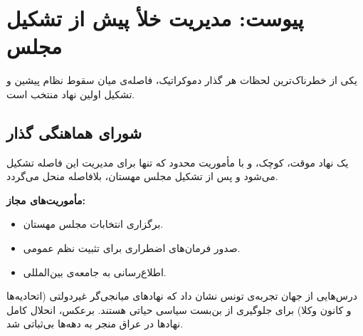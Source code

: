 \chapter*{پیوست: مدیریت خلأ پیش از تشکیل مجلس}

یکی از خطرناک‌ترین لحظات هر گذار دموکراتیک، فاصله‌ی میان سقوط نظام پیشین و تشکیل اولین نهاد منتخب است.

\section{شورای هماهنگی گذار}
یک نهاد موقت، کوچک، و با مأموریت محدود که تنها برای مدیریت این فاصله تشکیل می‌شود و پس از تشکیل مجلس مهستان، بلافاصله منحل می‌گردد.

\textbf{مأموریت‌های مجاز:}
\begin{itemize}
    \item برگزاری انتخابات مجلس مهستان.
    \item صدور فرمان‌های اضطراری برای تثبیت نظم عمومی.
    \item اطلاع‌رسانی به جامعه‌ی بین‌المللی.
\end{itemize}

\begin{modernbox}{درس‌هایی از جهان}
تجربه‌ی تونس نشان داد که نهادهای میانجی‌گر غیردولتی (اتحادیه‌ها و کانون وکلا) برای جلوگیری از بن‌بست سیاسی حیاتی هستند. برعکس، انحلال کامل نهادها در عراق منجر به دهه‌ها بی‌ثباتی شد.
\end{modernbox}
